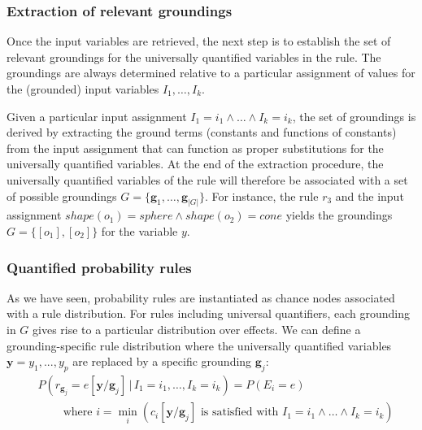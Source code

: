 

\subsubsection*{Extraction of relevant groundings}

Once the input variables are retrieved, the next step is to establish the set of relevant groundings for the universally quantified variables in the rule.  The groundings are always determined relative to a particular assignment of values for the (grounded) input variables $I_1, \dots, I_k$. 

Given a particular input assignment $I_1\!=\!i_1 \land \dots \land I_k\!=\!i_k$, the set of groundings is derived by extracting the ground terms (constants and functions of constants) from the input assignment that can function as proper substitutions for the universally quantified variables. At the end of the extraction procedure, the universally quantified variables of the rule will therefore be associated with a set of possible groundings $G = \{\mathbf{g}_1, \dots, \mathbf{g}_{|G|}\}$.  For instance, the rule $r_3$ and the input assignment $ \mathit{shape}(o_1)\!=\!\mathit{sphere} \land \mathit{shape}(o_2)\!=\!\mathit{cone}$ yields the groundings $G= \{[o_1], [o_2]\}$ for the variable $y$. 


\subsubsection*{Quantified probability rules}

As we have seen, probability rules are instantiated as chance nodes associated with a rule distribution.  For rules including universal quantifiers, each grounding in $G$ gives rise to a particular distribution over effects.   We can define a grounding-specific rule distribution where the universally quantified variables $\mathbf{y} = y_1,..., y_p$ are replaced by a specific grounding $\mathbf{g}_j$:
\begin{align}
& P(r_{\mathbf{g}_j}\!=\!e [\mathbf{y} / \mathbf{g}_j] \, | \, I_1\!=\!i_1, \dots, I_k\!=\!i_k) = P(E_i = e) \label{eq:quantifruledistrib}
 \\
& \; \; \; \; \; \; \; \; \text{where } i = \min_i (c_i[\mathbf{y} / \mathbf{g}_j]\text{ is satisfied with } I_1\!=\!i_1 \land \dots \land I_k\!=\!i_k) \nonumber \end{align}

